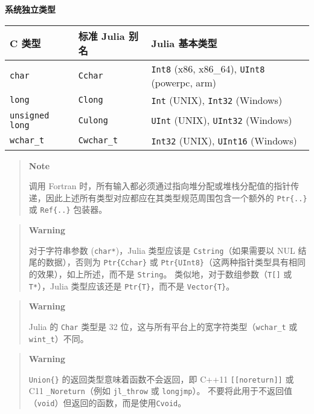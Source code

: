 \textbf{系统独立类型}




\begin{table}[h]

\begin{tabulary}{\linewidth}{|L|L|L|}
\hline
C 类型 & 标准 Julia 别名 & Julia 基本类型 \\
\hline
\texttt{char} & \texttt{Cchar} & \texttt{Int8} (x86, x86\_64), \texttt{UInt8} (powerpc, arm) \\
\hline
\texttt{long} & \texttt{Clong} & \texttt{Int} (UNIX), \texttt{Int32} (Windows) \\
\hline
\texttt{unsigned long} & \texttt{Culong} & \texttt{UInt} (UNIX), \texttt{UInt32} (Windows) \\
\hline
\texttt{wchar\_t} & \texttt{Cwchar\_t} & \texttt{Int32} (UNIX), \texttt{UInt16} (Windows) \\
\hline
\end{tabulary}

\end{table}



\begin{quote}
\textbf{Note}

调用 Fortran 时，所有输入都必须通过指向堆分配或堆栈分配值的指针传递，因此上述所有类型对应都应在其类型规范周围包含一个额外的 \texttt{Ptr\{..\}} 或 \texttt{Ref\{..\}} 包装器。

\end{quote}


\begin{quote}
\textbf{Warning}

对于字符串参数 (\texttt{char*})，Julia 类型应该是 \texttt{Cstring}（如果需要以 NUL 结尾的数据），否则为 \texttt{Ptr\{Cchar\}} 或 \texttt{Ptr\{UInt8\}}（这两种指针类型具有相同的效果），如上所述，而不是 \texttt{String}。 类似地，对于数组参数（\texttt{T[]} 或 \texttt{T*}），Julia 类型应该还是 \texttt{Ptr\{T\}}，而不是 \texttt{Vector\{T\}}。

\end{quote}


\begin{quote}
\textbf{Warning}

Julia 的 \texttt{Char} 类型是 32 位，这与所有平台上的宽字符类型（\texttt{wchar\_t} 或 \texttt{wint\_t}）不同。

\end{quote}


\begin{quote}
\textbf{Warning}

\texttt{Union\{\}} 的返回类型意味着函数不会返回，即 C++11 \texttt{[[noreturn]]} 或 C11 \texttt{\_Noreturn}（例如 \texttt{jl\_throw} 或 \texttt{longjmp}）。 不要将此用于不返回值（\texttt{void}）但返回的函数，而是使用\texttt{Cvoid}。

\end{quote}


